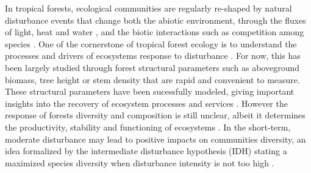 \documentclass[fleqn,10pt]{ArtEcoFoG} %
\begin{document}
In tropical forests, ecological communities are regularly re-shaped by
natural disturbance events that change both the abiotic environment,
through the fluxes of light, heat and water \citep{Goulamoussene2017},
and the biotic interactions such as competition among species
\citep{Chesson2000, Herault2018}. One of the cornerstone of tropical
forest ecology is to understand the processes and drivers of ecosystems
response to disturbance \citep{White2001, Chazdon2003a}. For now, this
has been largely studied through forest structural parameters such as
aboveground biomass, tree height or stem density
\citep{Piponiot2016, Rutishauser2016} that are rapid and convenient to
measure. These structural parameters have been sucessfully modeled,
giving important insights into the recovery of ecosystem processes and
services \citep{Herault2018}. However the response of forests diversity
and composition is still unclear, albeit it determines the productivity,
stability and functioning of ecosystems \citep{Tilman2014, Liang2016}.
In the short-term, moderate disturbance may lead to positive impacts on
communities diversity, an idea formalized by the intermediate
disturbance hypothesis (IDH) stating a maximized species diversity when
disturbance intensity is not too high
\citep{Molino2001, Kariuki2006a, Berry2008a}.
\end{document}

